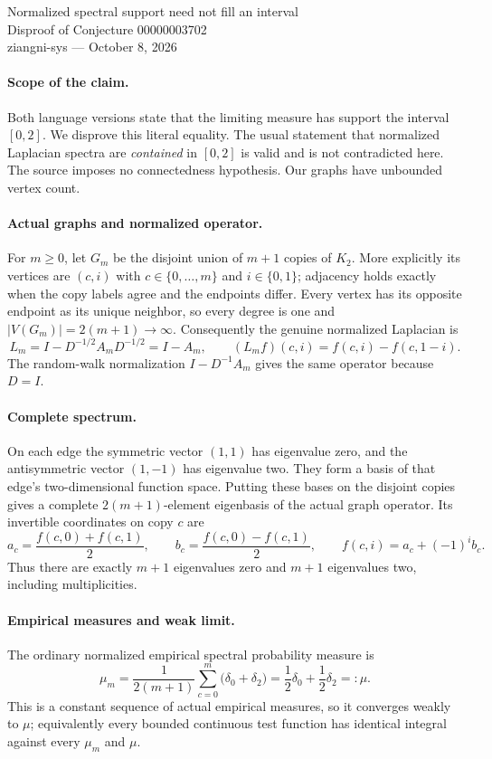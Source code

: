 \documentclass[11pt]{article}
\begin{document}
\begin{center}
{\Large Normalized spectral support need not fill an interval}\\[4pt]
Disproof of Conjecture 00000003702\\[4pt]
ziangni-sys --- October 8, 2026
\end{center}
\paragraph{Scope of the claim.}
Both language versions state that the limiting measure has support
the interval $[0,2]$. We disprove this literal equality. The usual
statement that normalized Laplacian spectra are \emph{contained}
in $[0,2]$ is valid and is not contradicted here. The source imposes
no connectedness hypothesis. Our graphs have unbounded vertex count.

\paragraph{Actual graphs and normalized operator.}
For $m\geq0$, let $G_m$ be the disjoint union of $m+1$ copies of
$K_2$. More explicitly its vertices are $(c,i)$ with
$c\in\{0,\ldots,m\}$ and $i\in\{0,1\}$; adjacency holds exactly
when the copy labels agree and the endpoints differ. Every vertex
has its opposite endpoint as its unique neighbor, so every degree
is one and $|V(G_m)|=2(m+1)\to\infty$.
Consequently the genuine normalized Laplacian is
\[
 L_m=I-D^{-1/2}A_mD^{-1/2}=I-A_m,
 \qquad (L_mf)(c,i)=f(c,i)-f(c,1-i).
\]
The random-walk normalization $I-D^{-1}A_m$ gives the same operator
because $D=I$.

\paragraph{Complete spectrum.}
On each edge the symmetric vector $(1,1)$ has eigenvalue zero,
and the antisymmetric vector $(1,-1)$ has eigenvalue two. They
form a basis of that edge's two-dimensional function space.
Putting these bases on the disjoint copies gives a complete
$2(m+1)$-element eigenbasis of the actual graph operator.
Its invertible coordinates on copy $c$ are
\[
 a_c=\frac{f(c,0)+f(c,1)}2,\qquad
 b_c=\frac{f(c,0)-f(c,1)}2,
 \qquad f(c,i)=a_c+(-1)^i b_c.
\]
Thus there are exactly $m+1$ eigenvalues zero and $m+1$ eigenvalues
two, including multiplicities.

\paragraph{Empirical measures and weak limit.}
The ordinary normalized empirical spectral probability measure is
\[
 \mu_m=\frac1{2(m+1)}\sum_{c=0}^{m}\bigl(\delta_0+\delta_2\bigr)
      =\frac12\delta_0+\frac12\delta_2=:\mu.
\]
This is a constant sequence of actual empirical measures, so it
converges weakly to $\mu$; equivalently every bounded continuous
test function has identical integral against every $\mu_m$ and $\mu$.
\end{document}
